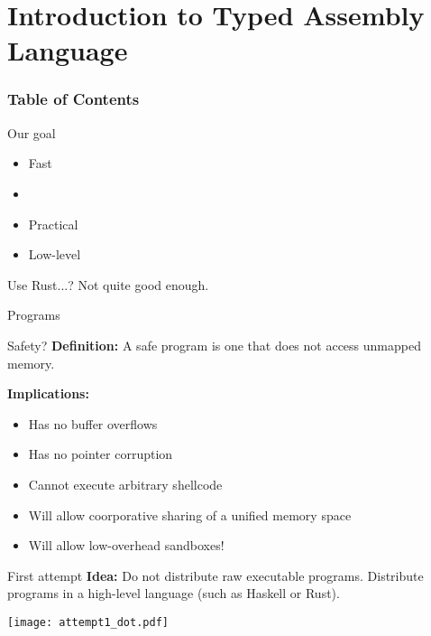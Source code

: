 \section{Introduction to Typed Assembly Language}
\begin{frame}
\frametitle{Table of Contents}
\tableofcontents[currentsection]
\end{frame}

\begin{frame}{Our goal}
  \begin{itemize}
  \item Fast
  \item {}
  \item Practical
  \item Low-level
  \end{itemize}

  \pause Use Rust...? \pause Not quite good enough.
\end{frame}

\begin{frame}{Programs}{}
\end{frame}

\begin{frame}{Safety?}
  \textbf{Definition:} A safe program is one that does not access unmapped
  memory.

  \pause \textbf{Implications:}

  \begin{itemize}
  \pause\item Has no buffer overflows
  \pause\item Has no pointer corruption
  \pause\item Cannot execute arbitrary shellcode
  \pause\item Will allow coorporative sharing of a unified memory space
  \pause\item Will allow low-overhead sandboxes!
  \end{itemize}
\end{frame}

\begin{frame}{First attempt}
  \textbf{Idea:} Do not distribute raw executable programs. Distribute programs
  in a high-level language (such as Haskell or Rust). \pause

  \pause \texttt{[image: attempt1\_dot.pdf]}
\end{frame}
